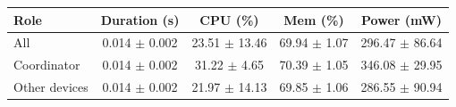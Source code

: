 \begin{tabular}{lcccc}
\hline
\textbf{Role} & \textbf{Duration (s)} & \textbf{CPU (\%)} & \textbf{Mem (\%)} & \textbf{Power (mW)} \\
\hline
All & 0.014 $\pm$ 0.002 & 23.51 $\pm$ 13.46 & 69.94 $\pm$ 1.07 & 296.47 $\pm$ 86.64 \\
Coordinator & 0.014 $\pm$ 0.002 & 31.22 $\pm$ 4.65 & 70.39 $\pm$ 1.05 & 346.08 $\pm$ 29.95 \\
Other devices & 0.014 $\pm$ 0.002 & 21.97 $\pm$ 14.13 & 69.85 $\pm$ 1.06 & 286.55 $\pm$ 90.94 \\
\hline
\end{tabular}
